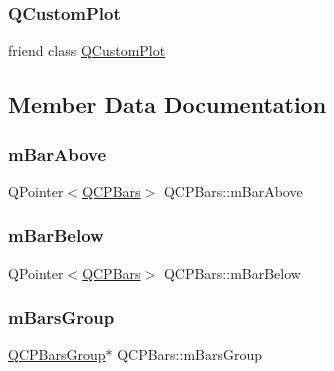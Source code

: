 \subsubsection{\texorpdfstring{QCustomPlot}{QCustomPlot}}
{\footnotesize\ttfamily friend class \mbox{\hyperlink{class_q_custom_plot}{Q\+Custom\+Plot}}\hspace{0.3cm}{\ttfamily [friend]}}



\subsection{Member Data Documentation}
\mbox{\label{class_q_c_p_bars_a0c1c46076c41a478dbb373cfd35929aa}} 
\subsubsection{\texorpdfstring{mBarAbove}{mBarAbove}}
{\footnotesize\ttfamily Q\+Pointer$<$\mbox{\hyperlink{class_q_c_p_bars}{Q\+C\+P\+Bars}}$>$ Q\+C\+P\+Bars\+::m\+Bar\+Above\hspace{0.3cm}{\ttfamily [protected]}}

\mbox{\label{class_q_c_p_bars_ad51db970eed7e286f2753b0216fc56de}} 
\subsubsection{\texorpdfstring{mBarBelow}{mBarBelow}}
{\footnotesize\ttfamily Q\+Pointer$<$\mbox{\hyperlink{class_q_c_p_bars}{Q\+C\+P\+Bars}}$>$ Q\+C\+P\+Bars\+::m\+Bar\+Below\hspace{0.3cm}{\ttfamily [protected]}}

\mbox{\label{class_q_c_p_bars_a9f59c255f3739182ca9744dff75beaa9}} 
\subsubsection{\texorpdfstring{mBarsGroup}{mBarsGroup}}
{\footnotesize\ttfamily \mbox{\hyperlink{class_q_c_p_bars_group}{Q\+C\+P\+Bars\+Group}}$\ast$ Q\+C\+P\+Bars\+::m\+Bars\+Group\hspace{0.3cm}{\ttfamily [protected]}}

